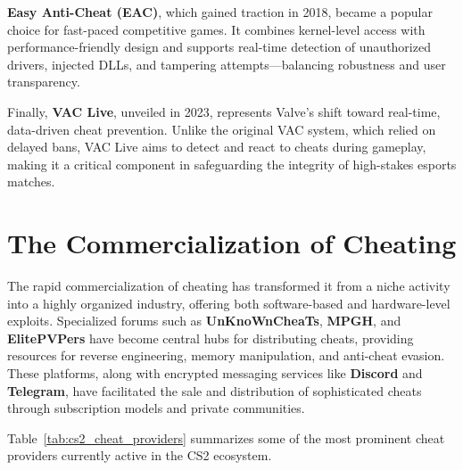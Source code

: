 \textbf{Easy Anti-Cheat (EAC)}, which gained traction in 2018, became a popular choice for fast-paced competitive games. It combines kernel-level access with performance-friendly design and supports real-time detection of unauthorized drivers, injected DLLs, and tampering attempts—balancing robustness and user transparency.

Finally, \textbf{VAC Live}, unveiled in 2023, represents Valve's shift toward real-time, data-driven cheat prevention. Unlike the original VAC system, which relied on delayed bans, VAC Live aims to detect and react to cheats during gameplay, making it a critical component in safeguarding the integrity of high-stakes esports matches.


\section{The Commercialization of Cheating}

The rapid commercialization of cheating has transformed it from a niche activity into a highly organized industry, offering both software-based and hardware-level exploits. Specialized forums such as \textbf{UnKnoWnCheaTs}, \textbf{MPGH}, and \textbf{ElitePVPers} have become central hubs for distributing cheats, providing resources for reverse engineering, memory manipulation, and anti-cheat evasion. These platforms, along with encrypted messaging services like \textbf{Discord} and \textbf{Telegram}, have facilitated the sale and distribution of sophisticated cheats through subscription models and private communities.

Table~\ref{tab:cs2_cheat_providers} summarizes some of the most prominent cheat providers currently active in the CS2 ecosystem.

